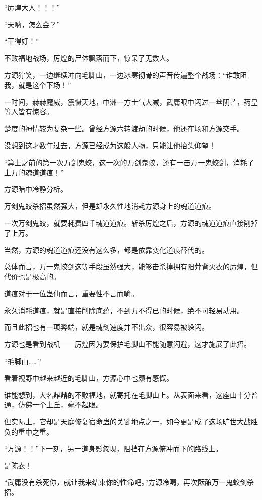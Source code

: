 
\begin{this_body}

“厉煌大人！！！”

“天呐，怎么会？”

“干得好！”

不败福地战场，厉煌的尸体飘落而下，惊呆了无数人。

方源狞笑，一边继续冲向毛脚山，一边冰寒彻骨的声音传遍整个战场：“谁敢阻我，就是这个下场！”

一时间，赫赫魔威，震慑天地，中洲一方士气大减，武庸眼中闪过一丝阴芒，药皇等人皆有惊容。

楚度的神情较为复杂一些。曾经方源六转渡劫的时候，他还在场和方源交手。

没想到这才数年过去，方源已经成为这般人物，只能让他抬头仰望！

“算上之前的第一次万剑鬼蛟，这一次的万剑鬼蛟，还有一击万一鬼蛟剑，消耗了上万的魂道道痕！”

方源暗中冷静分析。

万剑鬼蛟杀招虽然强大，但是却永久性地消耗方源身上的魂道道痕。

一次万剑鬼蛟，就要耗费四千魂道道痕。斩杀厉煌之后，方源的魂道道痕直接削掉了上万。

当然，方源的魂道道痕还没有这么多，都是依靠变化道痕替代的。

总体而言，万一鬼蛟剑这等手段虽然强大，能够击杀掉拥有阳莽背火衣的厉煌，但代价也是极高的。

道痕对于一位蛊仙而言，重要性不言而喻。

永久消耗道痕，就是直接削除底蕴，不到万不得已的时候，绝不可轻易动用。

而且此招也有一项弊端，就是魂剑速度并不出众，很容易被躲闪。

方源也是看到战机——厉煌因为要保护毛脚山不能随意闪避，这才施展了此招。

“毛脚山……”

看着视野中越来越近的毛脚山，方源心中也颇有感慨。

谁能想到，大名鼎鼎的不败福地，就寄托在毛脚山上。从表面来看，这座山十分普通，仿佛一个土丘，毫不起眼。

但实际上，它却是天庭修复宿命蛊的关键地点之一，如今更是成了这场旷世大战胜负的重中之重。

“方源！！”下一刻，另一道身影忽现，阻挡在方源俯冲而下的路线上。

是陈衣！

“武庸没有杀死你，就让我来结束你的性命吧。”方源冷喝，再次酝酿万一鬼蛟剑杀招。


\end{this_body}
